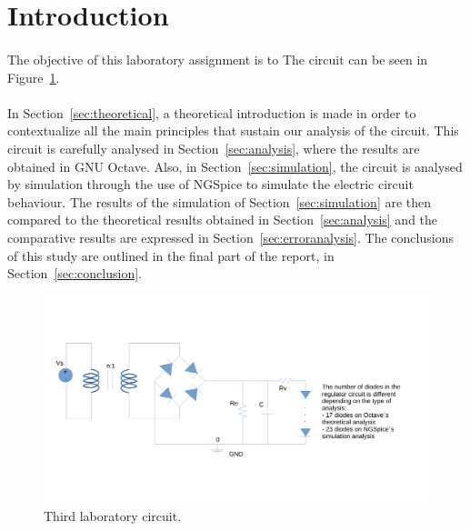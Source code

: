 \section{Introduction}
\label{sec:introduction}

\paragraph{} 
The objective of this laboratory assignment is to 
The circuit can be seen in Figure~\ref{fig:circuit}.


\paragraph{}
In Section~\ref{sec:theoretical}, a theoretical introduction is made in order to contextualize all the main principles that sustain our analysis of the circuit. This circuit is carefully analysed in Section~\ref{sec:analysis}, where the results are obtained in GNU Octave. Also, in Section~\ref{sec:simulation}, the circuit is analysed by simulation through the use of NGSpice to simulate the electric circuit behaviour. The results of the simulation of Section~\ref{sec:simulation} are then compared to the theoretical results obtained in Section~\ref{sec:analysis} and the comparative results are expressed in Section~\ref{sec:erroranalysis}. The conclusions of this study are outlined in the final part of the report, in Section~\ref{sec:conclusion}.


\begin{figure}[h] \centering
\includegraphics[width=0.4\linewidth]{circuit.pdf}
\caption{Third laboratory circuit.}
\label{fig:circuit}
\end{figure}

